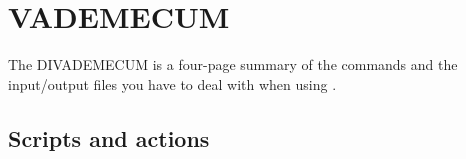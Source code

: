 \chapter{VADEMECUM\label{chap:divademecum}}


The DIVADEMECUM is a four-page summary of the commands and the input/output files you have to deal with when using \diva.

\minitoc


\newpage

\vspace*{-3cm}
\section{Scripts and actions}
\begin{table}[H]
\centering
\caption[DIVADEMECUM: \diva input and output files]{DIVADEMECUM: \diva in- and outputs. When not specified differently, input files are from directory  {\tt ./input} and 
output files are placed in directory {\tt ./output}. Script {\tt divarefe} takes the same inputs as {\tt divacalc}
while {\tt divaanom} and {\tt divasumup} use no other user-provided files than the other scripts. Brackets {\tt [ ]} enclose optional files or parameters. Ex. {\tt [-r]} will replace an input file by the outputs from the scripts.\label{vdm}}



\end{table}
